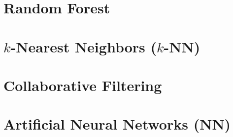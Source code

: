 \section{Random Forest}
\label{class:RF}


\section{\texorpdfstring{$k$}{k}-Nearest Neighbors (\texorpdfstring{$k$}{k}-NN)}
\label{class:kNN}

\section{Collaborative Filtering}
\label{class:cf}

\section{Artificial Neural Networks (NN)}
\label{class:ANN}


